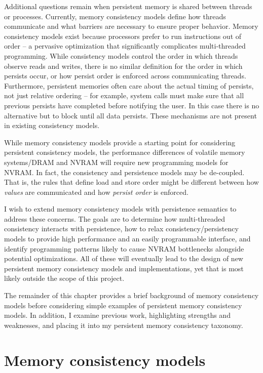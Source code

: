 Additional questions remain when persistent memory is shared between threads or processes.
Currently, memory consistency models define how threads communicate and what barriers are necessary to ensure proper behavior.
Memory consistency models exist because processors prefer to run instructions out of order -- a pervasive optimization that significantly complicates multi-threaded programming.
While consistency models control the order in which threads observe reads and writes, there is no similar definition for the order in which persists occur, or how persist order is enforced across communicating threads.
Furthermore, persistent memories often care about the actual timing of persists, not just relative ordering -- for example, system calls must make sure that all previous persists have completed before notifying the user.
In this case there is no alternative but to block until all data persists.
These mechanisms are not present in existing consistency models.

While memory consistency models provide a starting point for considering persistent consistency models, the performance differences of volatile memory systems/DRAM and NVRAM will require new programming models for NVRAM.
In fact, the consistency and persistence models may be de-coupled.
That is, the rules that define load and store order might be different between how \emph{values} are communicated and how \emph{persist order} is enforced.

I wish to extend memory consistency models with persistence semantics to address these concerns.
The goals are to determine how multi-threaded consistency interacts with persistence, how to relax consistency/persistency models to provide high performance and an easily programmable interface, and identify programming patterns likely to cause NVRAM bottlenecks alongside potential optimizations.
All of these will eventually lead to the design of new persistent memory consistency models and implementations, yet that is most likely outside the scope of this project.

The remainder of this chapter provides a brief background of memory consistency models before considering simple examples of persistent memory consistency models.
In addition, I examine previous work, highlighting strengths and weaknesses, and placing it into my persistent memory consistency taxonomy.

\section{Memory consistency models}
\label{sec:PMC:MemoryConsistency}


